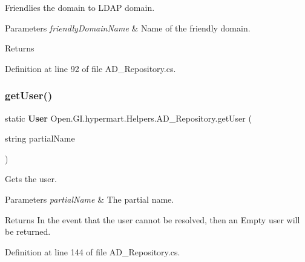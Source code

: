 Friendlies the domain to L\+D\+AP domain. 


\begin{DoxyParams}{Parameters}
{\em friendly\+Domain\+Name} & Name of the friendly domain.\\
\hline
\end{DoxyParams}
\begin{DoxyReturn}{Returns}

\end{DoxyReturn}


Definition at line 92 of file A\+D\+\_\+\+Repository.\+cs.

\mbox{\label{class_open_1_1_g_i_1_1hypermart_1_1_helpers_1_1_a_d___repository_ab3cdd5f9a962e26fcb50033a5dc4fc0f}} 
\subsubsection{get\+User()}
{\footnotesize\ttfamily static \textbf{ User} Open.\+G\+I.\+hypermart.\+Helpers.\+A\+D\+\_\+\+Repository.\+get\+User (\begin{DoxyParamCaption}\item[{string}]{partial\+Name }\end{DoxyParamCaption})\hspace{0.3cm}{\ttfamily [static]}}



Gets the user. 


\begin{DoxyParams}{Parameters}
{\em partial\+Name} & The partial name.\\
\hline
\end{DoxyParams}
\begin{DoxyReturn}{Returns}
In the event that the user cannot be resolved, then an Empty user will be returned.
\end{DoxyReturn}


Definition at line 144 of file A\+D\+\_\+\+Repository.\+cs.

\mbox{\label{class_open_1_1_g_i_1_1hypermart_1_1_helpers_1_1_a_d___repository_acf1eb85047c96cf0925f10a7acd96859}} 
